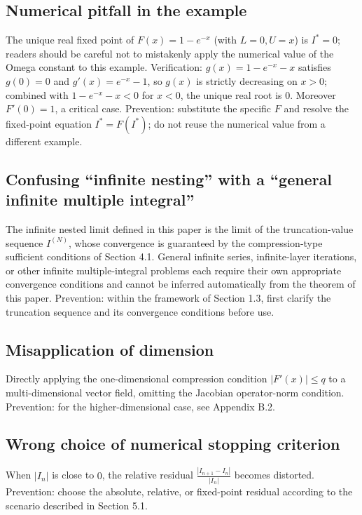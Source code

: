 \documentclass[11pt,a4paper]{amsart}
\begin{document}
\subsection{Numerical pitfall in the example}
The unique real fixed point of $F(x) = 1 - e^{-x}$ (with $L = 0, U = x$) is $I^* = 0$; readers should be careful not to mistakenly apply the numerical value of the Omega constant to this example. Verification: $g(x) = 1 - e^{-x} - x$ satisfies $g(0) = 0$ and $g'(x) = e^{-x} - 1$, so $g(x)$ is strictly decreasing on $x > 0$; combined with $1 - e^{-x} - x < 0$ for $x < 0$, the unique real root is $0$. Moreover $F'(0) = 1$, a critical case. Prevention: substitute the specific $F$ and resolve the fixed-point equation $I^* = F(I^*)$; do not reuse the numerical value from a different example.

\subsection{Confusing ``infinite nesting'' with a ``general infinite multiple integral''}
The infinite nested limit defined in this paper is the limit of the truncation-value sequence $I^{(N)}$, whose convergence is guaranteed by the compression-type sufficient conditions of Section 4.1. General infinite series, infinite-layer iterations, or other infinite multiple-integral problems each require their own appropriate convergence conditions and cannot be inferred automatically from the theorem of this paper. Prevention: within the framework of Section 1.3, first clarify the truncation sequence and its convergence conditions before use.

\subsection{Misapplication of dimension}
Directly applying the one-dimensional compression condition $|F'(x)| \le q$ to a multi-dimensional vector field, omitting the Jacobian operator-norm condition. Prevention: for the higher-dimensional case, see Appendix B.2.

\subsection{Wrong choice of numerical stopping criterion}
When $|I_n|$ is close to $0$, the relative residual $\frac{|I_{n+1} - I_n|}{|I_n|}$ becomes distorted. Prevention: choose the absolute, relative, or fixed-point residual according to the scenario described in Section 5.1.
\end{document}
